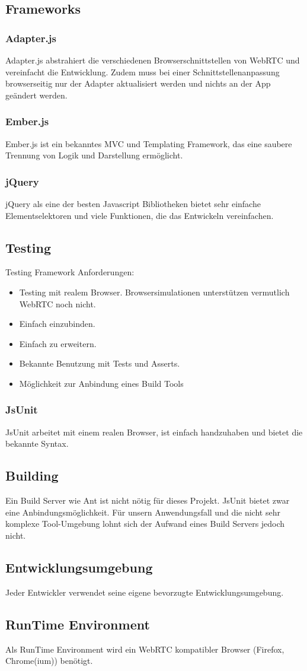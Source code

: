 \subsection{Frameworks}
\subsubsection{Adapter.js}
Adapter.js abstrahiert die verschiedenen Browserschnittstellen von WebRTC und vereinfacht die Entwicklung. Zudem muss bei einer Schnittstellenanpassung browserseitig nur der Adapter aktualisiert werden und nichts an der App geändert werden.

\subsubsection{Ember.js}
Ember.js ist ein bekanntes MVC und Templating Framework, das eine saubere Trennung von Logik und Darstellung ermöglicht.

\subsubsection{jQuery}
jQuery als eine der besten Javascript Bibliotheken bietet sehr einfache Elementselektoren und viele Funktionen, die das Entwickeln vereinfachen.


\subsection{Testing}
Testing Framework Anforderungen:
\begin{itemize}
	\setlength{\itemsep}{-\parsep}
	\item Testing mit realem Browser. Browsersimulationen unterstützen vermutlich WebRTC noch nicht.
	\item Einfach einzubinden.
	\item Einfach zu erweitern.
	\item Bekannte Benutzung mit Tests und Asserts.
	\item Möglichkeit zur Anbindung eines Build Tools
\end{itemize}

\subsubsection{JsUnit}
JsUnit arbeitet mit einem realen Browser, ist einfach handzuhaben und bietet die bekannte Syntax.


\subsection{Building}
Ein Build Server wie Ant ist nicht nötig für dieses Projekt. JsUnit bietet zwar eine Anbindungsmöglichkeit. Für unsern Anwendungsfall und die nicht sehr komplexe Tool-Umgebung lohnt sich der Aufwand eines Build Servers jedoch nicht.


\subsection{Entwicklungsumgebung}
Jeder Entwickler verwendet seine eigene bevorzugte Entwicklungsumgebung.


\subsection{RunTime Environment}
Als RunTime Environment wird ein WebRTC kompatibler Browser (Firefox, Chrome(ium)) benötigt.


